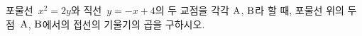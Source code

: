 포물선~$x^2=2y$와 직선~$y=-x+4$의 두 교점을 각각 $\mathrm{A}$, $\mathrm{B}$라 할 때, 포물선 위의 두 점~$\mathrm{A}$, $\mathrm{B}$에서의 접선의 기울기의 곱을 구하시오.
